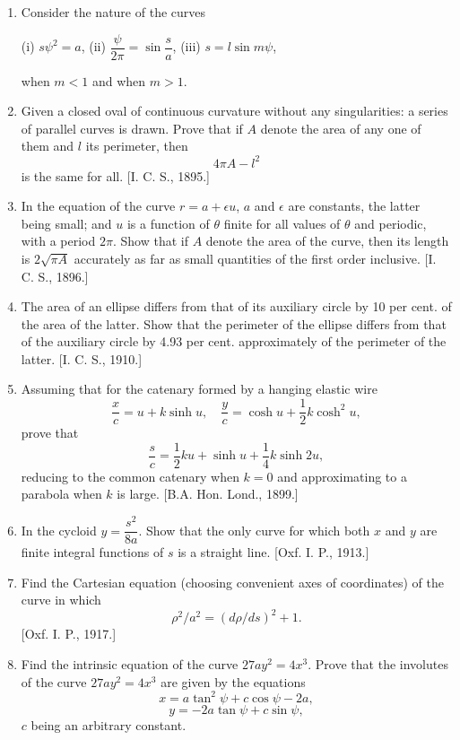 \documentclass[11pt, a4paper]{article}
\newcommand{\source}[1]{\hfill\textnormal{[#1]}}
\begin{document}
\begin{enumerate}[leftmargin=2em]
Obtain also a formula for the rectification of the curve. (The result is not obtainable in finite terms.) \source{I. C. S., 1898.}

\item Consider the nature of the curves

(i) $s\psi^2=a$,  (ii) $\dfrac{\psi}{2\pi}=\sin\dfrac{s}{a}$,  (iii) $s=l\sin m\psi$,

when $m<1$ and when $m>1$.

\item Given a closed oval of continuous curvature without any singularities: a series of parallel curves is drawn. Prove that if $A$ denote the area of any one of them and $l$ its perimeter, then
\[
4\pi A-l^2
\]
is the same for all. \source{I. C. S., 1895.}

\item In the equation of the curve $r=a+\epsilon u$, $a$ and $\epsilon$ are constants, the latter being small; and $u$ is a function of $\theta$ finite for all values of $\theta$ and periodic, with a period $2\pi$. Show that if $A$ denote the area of the curve, then its length is $2\sqrt{\pi A}$ accurately as far as small quantities of the first order inclusive. \source{I. C. S., 1896.}

\item The area of an ellipse differs from that of its auxiliary circle by 10 per cent. of the area of the latter. Show that the perimeter of the ellipse differs from that of the auxiliary circle by 4.93 per cent. approximately of the perimeter of the latter. \source{I. C. S., 1910.}

\item Assuming that for the catenary formed by a hanging elastic wire
\[
\frac{x}{c}=u+k\sinh u,\quad \frac{y}{c}=\cosh u+\frac12k\cosh^2u,
\]
prove that
\[
\frac{s}{c}=\frac12ku+\sinh u+\frac14k\sinh2u,
\]
reducing to the common catenary when $k=0$ and approximating to a parabola when $k$ is large. \source{B.A. Hon. Lond., 1899.}

\item In the cycloid $y=\dfrac{s^2}{8a}$. Show that the only curve for which both $x$ and $y$ are finite integral functions of $s$ is a straight line. \source{Oxf. I. P., 1913.}

\item Find the Cartesian equation (choosing convenient axes of coordinates) of the curve in which
\[
\rho^2/a^2=(d\rho/ds)^2+1.
\]
\source{Oxf. I. P., 1917.}

\item Find the intrinsic equation of the curve $27ay^2=4x^3$. Prove that the involutes of the curve $27ay^2=4x^3$ are given by the equations
\[
x=a\tan^2\psi+c\cos\psi-2a,
\]
\[
y=-2a\tan\psi+c\sin\psi,
\]
$c$ being an arbitrary constant.


\end{enumerate}
\end{document}
